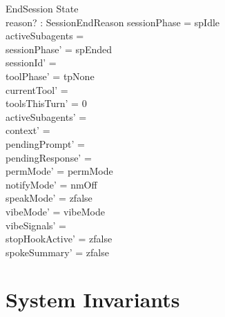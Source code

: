 \documentclass[a4paper,10pt,fleqn]{article}
\begin{document}
\begin{schema}{EndSession}
  \Delta State \\
  reason? : SessionEndReason
  \where
  sessionPhase = spIdle \\
  activeSubagents = \emptyset \\
  sessionPhase' = spEnded \\
  sessionId' = \emptyset \\
  toolPhase' = tpNone \\
  currentTool' = \emptyset \\
  toolsThisTurn' = 0 \\
  activeSubagents' = \emptyset \\
  context' = \langle \rangle \\
  pendingPrompt' = \emptyset \\
  pendingResponse' = \emptyset \\
  permMode' = permMode \\
  notifyMode' = nmOff \\
  speakMode' = zfalse \\
  vibeMode' = vibeMode \\
  vibeSignals' = \emptyset \\
  stopHookActive' = zfalse \\
  spokeSummary' = zfalse
\end{schema}

\section{System Invariants}
\end{document}
